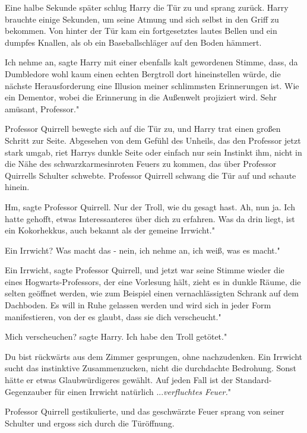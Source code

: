 Eine halbe Sekunde später schlug Harry die Tür zu und sprang zurück. Harry
brauchte einige Sekunden, um seine Atmung und sich selbst in den Griff zu
bekommen. Von hinter der Tür kam ein fortgesetztes lautes Bellen und ein dumpfes
Knallen, als ob ein Baseballschläger auf den Boden hämmert.

\glqq Ich nehme an\grqq{}, sagte Harry mit einer ebenfalls kalt gewordenen
Stimme, \glqq dass, da Dumbledore wohl kaum einen echten Bergtroll dort
hineinstellen würde, die nächste Herausforderung eine Illusion meiner
schlimmsten Erinnerungen ist. Wie ein Dementor, wobei die Erinnerung in die
Außenwelt projiziert wird. Sehr amüsant, Professor."

Professor Quirrell bewegte sich auf die Tür zu, und Harry trat einen großen
Schritt zur Seite. Abgesehen von dem Gefühl des Unheils, das den Professor jetzt
stark umgab, riet Harrys dunkle Seite oder einfach nur sein Instinkt ihm, nicht
in die Nähe des schwarzkarmesinroten Feuers zu kommen, das über Professor
Quirrells Schulter schwebte. Professor Quirrell schwang die Tür auf und schaute
hinein.

\glqq Hm\grqq{}, sagte Professor Quirrell. \glqq Nur der Troll, wie du gesagt
hast. Ah, nun ja. Ich hatte gehofft, etwas Interessanteres über dich zu
erfahren. Was da drin liegt, ist ein Kokorhekkus, auch bekannt als der gemeine
Irrwicht."

\glqq Ein Irrwicht? Was macht das - nein, ich nehme an, ich weiß, was es macht."

\glqq Ein Irrwicht\grqq{}, sagte Professor Quirrell, und jetzt war seine Stimme
wieder die eines Hogwarts-Professors, der eine Vorlesung hält, \glqq zieht es in
dunkle Räume, die selten geöffnet werden, wie zum Beispiel einen
vernachlässigten Schrank auf dem Dachboden. Es will in Ruhe gelassen werden und
wird sich in jeder Form manifestieren, von der es glaubt, dass sie dich
verscheucht."

\glqq Mich verscheuchen?\grqq{} sagte Harry. \glqq Ich habe den Troll getötet."

\glqq Du bist rückwärts aus dem Zimmer gesprungen, ohne nachzudenken. Ein
Irrwicht sucht das instinktive Zusammenzucken, nicht die durchdachte Bedrohung.
Sonst hätte er etwas Glaubwürdigeres gewählt. Auf jeden Fall ist der
Standard-Gegenzauber für einen Irrwicht natürlich ...\emph{verfluchtes Feuer.}"

Professor Quirrell gestikulierte, und das geschwärzte Feuer sprang von seiner
Schulter und ergoss sich durch die Türöffnung.

